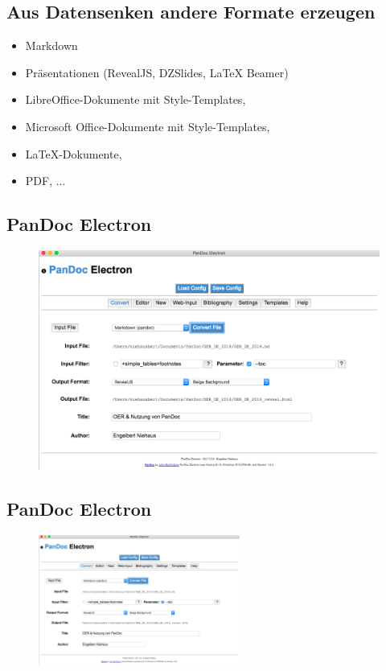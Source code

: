 \documentclass[]{article}
\providecommand{\tightlist}{%
  \setlength{\itemsep}{0pt}\setlength{\parskip}{0pt}}
\begin{document}
\subsection{Aus Datensenken andere Formate
erzeugen}\label{aus-datensenken-andere-formate-erzeugen}

\begin{itemize}
\tightlist
\item
  Markdown
\item
  Präsentationen (RevealJS, DZSlides, LaTeX Beamer)
\item
  LibreOffice-Dokumente mit Style-Templates,
\item
  Microsoft Office-Dokumente mit Style-Templates,
\item
  LaTeX-Dokumente,
\item
  PDF, ...
\end{itemize}

\subsection{PanDoc Electron}\label{pandoc-electron}

\begin{figure}[htbp]
\centering
\includegraphics[width=7.29167in]{./images/PanDocElectronMain.png}
\caption{}
\end{figure}

\subsection{PanDoc Electron}\label{pandoc-electron-1}

\begin{figure}[htbp]
\centering
\includegraphics[width=2.60417in]{./images/PanDocElectronMain.png}
\caption{}
\end{figure}
\end{document}
